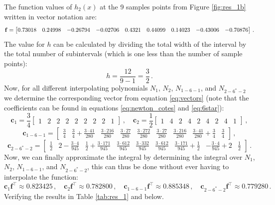 The function values of $h_2(x)$ at the 9 samples points from Figure \ref{fig:res_1b} written in vector notation are:
\begin{equation}
    \scalemath{0.99}{
    \mathbf f =
    \begin{bmatrix}
        0.73018 & 0.24998 & -0.26794 & -0.02706 & 0.4321 & 0.44099 & 0.14023 & -0.43006 & -0.70876
    \end{bmatrix} \,.} \nonumber
\end{equation}
The value for $h$ can be calculated by dividing the total width of the interval by the total number of subintervals (which is one less than the number of sample points):
\begin{equation}
    h = \frac{12}{9-1} = \frac{3}{2} \,.\nonumber
\end{equation}
Now, for all different interpolating polynomials $N_1$, $N_2$, $N_{1-6-1}$, and $N_{2-6^*-2}$ we determine the corresponding vector from equation \ref{eq:vectors} (note that the coefficients can be found in equations \ref{eq:newton_cotes} and \ref{eq:6star}):
\begin{equation}
    \mathbf c_1 = \frac{3}{4}
    \begin{bmatrix}
        1 & 2 & 2 & 2 & 2 & 2 & 2 & 2 & 1
    \end{bmatrix} \,, \quad
    \mathbf c_2 = \frac{1}{2}
    \begin{bmatrix}
        1 & 4 & 2 & 4 & 2 & 4 & 2 & 4 & 1
    \end{bmatrix} \,,\nonumber
\end{equation}
\begin{equation}
    \mathbf c_{1-6-1} = \begin{bmatrix}
        \frac{3}{4} & \frac{3}{4} + \frac{3\cdot 41}{280} & \frac{3\cdot 216}{280} & \frac{3\cdot 27}{280} & \frac{3\cdot 272}{280} & \frac{3\cdot 27}{280} & \frac{3\cdot 216}{280} & \frac{3\cdot 41}{280} + \frac{3}{4} & \frac{3}{4}
    \end{bmatrix} \,,\nonumber
\end{equation}
\begin{equation}
    \mathbf c_{2-6^*-2} = \begin{bmatrix}
        \frac{1}{2} & 2 - \frac{3\cdot 4}{945} & \frac{1}{2}+\frac{3\cdot 171}{945} & \frac{3\cdot 612}{945} & \frac{3\cdot 332}{945} & \frac{3\cdot 612}{945} & \frac{3\cdot 171}{945}+\frac{1}{2} & -\frac{3\cdot 4}{945} + 2 & \frac{1}{2}
    \end{bmatrix} \,.\nonumber
\end{equation}
Now, we can finally approximate the integral by determining the integral over $N_1$, $N_2$, $N_{1-6-1}$, and $N_{2-6^*-2}$, this can thus be done without ever having to interpolate the function:
\begin{equation}
    \mathbf c_1 \mathbf f^\top \approx 0.823425 \,, \quad
    \mathbf c_2 \mathbf f^\top \approx 0.782800 \,, \quad
    \mathbf c_{1-6-1} \mathbf f^\top \approx 0.885348 \,, \quad
    \mathbf c_{2-6^*-2} \mathbf f^\top \approx 0.779280 \,. \nonumber
\end{equation}
Verifying the results in Table \ref{tab:res_1} and below.

